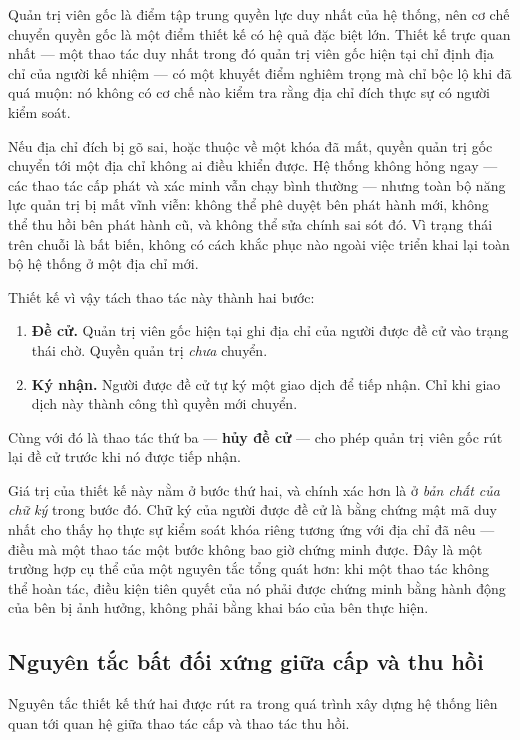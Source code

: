 Quản trị viên gốc là điểm tập trung quyền lực duy nhất của hệ thống, nên cơ chế chuyển quyền gốc là một điểm thiết kế có hệ quả đặc biệt lớn. Thiết kế trực quan nhất --- một thao tác duy nhất trong đó quản trị viên gốc hiện tại chỉ định địa chỉ của người kế nhiệm --- có một khuyết điểm nghiêm trọng mà chỉ bộc lộ khi đã quá muộn: nó không có cơ chế nào kiểm tra rằng địa chỉ đích thực sự có người kiểm soát.

Nếu địa chỉ đích bị gõ sai, hoặc thuộc về một khóa đã mất, quyền quản trị gốc chuyển tới một địa chỉ không ai điều khiển được. Hệ thống không hỏng ngay --- các thao tác cấp phát và xác minh vẫn chạy bình thường --- nhưng toàn bộ năng lực quản trị bị mất vĩnh viễn: không thể phê duyệt bên phát hành mới, không thể thu hồi bên phát hành cũ, và không thể sửa chính sai sót đó. Vì trạng thái trên chuỗi là bất biến, không có cách khắc phục nào ngoài việc triển khai lại toàn bộ hệ thống ở một địa chỉ mới.

Thiết kế vì vậy tách thao tác này thành hai bước:

\begin{enumerate}
    \item \textbf{Đề cử.} Quản trị viên gốc hiện tại ghi địa chỉ của người được đề cử vào trạng thái chờ. Quyền quản trị \emph{chưa} chuyển.
    \item \textbf{Ký nhận.} Người được đề cử tự ký một giao dịch để tiếp nhận. Chỉ khi giao dịch này thành công thì quyền mới chuyển.
\end{enumerate}

Cùng với đó là thao tác thứ ba --- \textbf{hủy đề cử} --- cho phép quản trị viên gốc rút lại đề cử trước khi nó được tiếp nhận.

Giá trị của thiết kế này nằm ở bước thứ hai, và chính xác hơn là ở \emph{bản chất của chữ ký} trong bước đó. Chữ ký của người được đề cử là bằng chứng mật mã duy nhất cho thấy họ thực sự kiểm soát khóa riêng tương ứng với địa chỉ đã nêu --- điều mà một thao tác một bước không bao giờ chứng minh được. Đây là một trường hợp cụ thể của một nguyên tắc tổng quát hơn: khi một thao tác không thể hoàn tác, điều kiện tiên quyết của nó phải được chứng minh bằng hành động của bên bị ảnh hưởng, không phải bằng khai báo của bên thực hiện.

\subsection{Nguyên tắc bất đối xứng giữa cấp và thu hồi}

Nguyên tắc thiết kế thứ hai được rút ra trong quá trình xây dựng hệ thống liên quan tới quan hệ giữa thao tác cấp và thao tác thu hồi.

